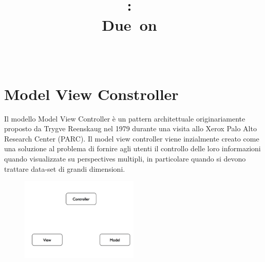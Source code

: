 \documentclass{article}
\title{
\vspace{2in}
\textmd{\textbf{\hmwkClass:\ \hmwkTitle}}\\
\normalsize\vspace{0.1in}\small{Due\ on\ \hmwkDueDate}\\
\vspace{0.1in}\large{\textit{\hmwkClassInstructor\ \hmwkClassTime}}
\vspace{3in}
}
\author{\textbf{\hmwkAuthorName}}
\date{} %
\begin{document}
\maketitle



\newpage
\tableofcontents
\newpage



\section{Model View Constroller}
Il modello Model View Controller \`e un pattern architettuale originariamente proposto da Trygve Reenskaug nel 1979 durante una visita allo  Xerox Palo Alto Research Center (PARC). Il model view controller viene inzialmente creato come una soluzione al problema di fornire agli utenti il controllo delle loro informazioni quando visualizzate su perspectives multipli, in particolare quando si devono trattare data-set di grandi dimensioni.

\begin{figure}[h]
\centering
\includegraphics[width=0.5\textwidth]{Img/MVC1.pdf}
\end{figure}
\end{document}
